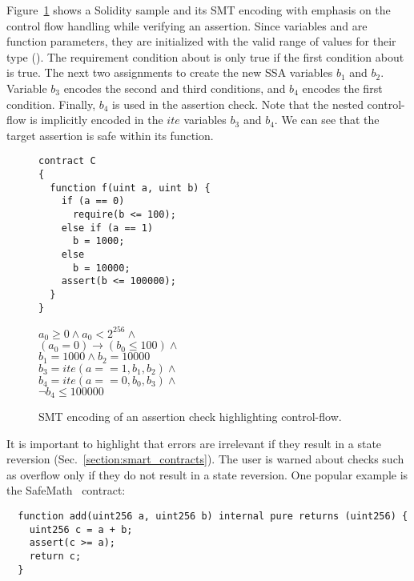 Figure~\ref{figure:solidity_encoding_1} shows a Solidity sample and its SMT
encoding with emphasis on the control flow handling while verifying an assertion.
%
Since variables  and  are function parameters, they
are initialized with the valid range of values for their type ().
%
The requirement condition about  is only true if the first condition
about  is true.
%
The next two assignments to  create the new SSA variables
$b_1$ and $b_2$.
%
Variable $b_3$ encodes the second and third conditions, and $b_4$
encodes the first condition.
%
Finally, $b_4$ is used in the assertion check.
%
Note that the nested control-flow is implicitly encoded in the $ite$
variables $b_3$ and $b_4$.
%
We can see that the target assertion is safe within its function.

\begin{figure}
\label{figure:solidity_encoding_1}
\noindent\begin{minipage}{.48\textwidth}
\begin{verbatim}
contract C
{
  function f(uint a, uint b) {
    if (a == 0)
      require(b <= 100);
    else if (a == 1)
      b = 1000;
    else
      b = 10000;
    assert(b <= 100000);
  }
}
\end{verbatim}
\end{minipage}\hfill
\begin{minipage}{.48\textwidth}
$a_0 \ge 0 \land a_0 < 2^{256} \land$\\
$(a_0 = 0) \rightarrow (b_0 \le 100) \land$\\
$b_1 = 1000 \land b_2 = 10000$\\
$b_3 = ite(a == 1, b_1, b_2) \land$\\
$b_4 = ite(a == 0, b_0, b_3) \land$\\
$\neg b_4 \le 100000$
\end{minipage}
\caption{SMT encoding of an assertion check highlighting control-flow.}
\end{figure}

It is important to highlight that errors are irrelevant if they result in a
state reversion (Sec.~\ref{section:smart_contracts}). The user is warned
about checks such as overflow only if they do not result in a state reversion.
%
One popular example is the SafeMath~\cite{SafeMath} contract:

\begin{verbatim}
  function add(uint256 a, uint256 b) internal pure returns (uint256) {
    uint256 c = a + b;
    assert(c >= a);
    return c;
  }
\end{verbatim}

